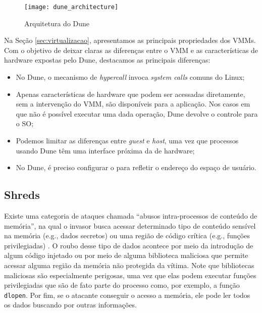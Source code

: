 \begin{figure}[!h]
  \centering
  \texttt{[image: dune\_architecture]} 
	\caption[Arquitetura do Dune]{Arquitetura do Dune~\citep{belay}}
  \label{fig:dune_architecture}
\end{figure}

Na Seção \ref{sec:virtualizacao}, apresentamos as principais propriedades dos VMMs.
Com o objetivo de deixar claras as diferenças entre o VMM e as características
de hardware expostas pelo Dune, destacamos as principais diferenças:

\begin{itemize}
  \item No Dune, o mecanismo de \textit{hypercall} invoca
        \textit{system calls} comuns do Linux;
  \item Apenas características de hardware que podem ser acessadas diretamente,
        sem a intervenção do VMM, são disponíveis para a aplicação. Nos casos em
        que não é possível executar uma dada operação, Dune devolve o controle
        para o SO;
  \item Podemos limitar as diferenças entre \textit{guest} e \textit{host}, uma
        vez que processos usando Dune têm uma interface próxima da de hardware;
  \item No Dune, é preciso configurar o  para refletir o endereço do espaço
        de usuário.
\end{itemize}

\subsection{Shreds}

Existe uma categoria de ataques chamada ``abusos intra-processos de conteúdo
de memória'', na qual o invasor busca acessar determinado tipo de conteúdo
sensível na memória (e.g., dados secretos) ou uma região de código crítica
(e.g., funções privilegiadas) \citep{shreds}. O roubo desse tipo de dados
acontece por meio da introdução de algum código injetado ou por meio de alguma
biblioteca maliciosa que permite acessar alguma região da memória não protegida
da vítima. Note que bibliotecas maliciosas são especialmente perigosas, uma vez
que elas podem executar funções privilegiadas que são de fato parte do
processo como, por exemplo, a função \texttt{dlopen}. Por fim, se o atacante
conseguir o acesso a memória, ele pode ler todos os dados buscando por outras
informações.

